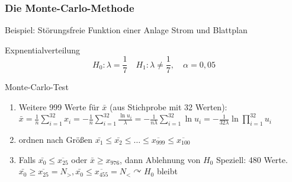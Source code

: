\documentclass[a4paper]{scrartcl}
\begin{document}
\subsubsection{Die Monte-Carlo-Methode}
Beispiel: Störungsfreie Funktion einer Anlage Strom und Blattplan

Expnentialverteilung
\[H_0 : \lambda = \frac{1}{7} \quad H_1 : \lambda \neq \frac{1}{7}, \quad \alpha = 0,05\]

Monte-Carlo-Test
\begin{enumerate}
\item Weitere 999 Werte für $\bar{x}$ (aus Stichprobe mit 32 Werten):\\
$\bar{x} = \frac{1}{n} \sum\limits_{i=1}^{32} x_i = - \frac{1}{n} \sum\limits_{i=1}^{32} \frac{\ln{u_i}}{\lambda} = - \frac{1}{n\lambda} \sum\limits_{i=1}^{32} \ln{u_i} = -\frac{1}{32\lambda} \ln \prod\limits_{i=1}^{32} u_i$
\item ordnen nach Größen $\bar{x_1} \leq \bar{x_2} \leq \dots \leq \overline{x_{999}} \leq \overline{x_{100}}$
\item Falls $\bar{x_0} \leq \overline{x_{25}}$ oder $ \bar{x} \geq x_{976}$, dann Ablehnung von $H_0$ Speziell: 480 Werte. $\bar{x_0} \geq  \overline{x_{25}} = N_>, \bar{x_0} \leq \overline{x_{455}} = N_< \curvearrowright H_0$ bleibt
\end{enumerate}
\end{document}
